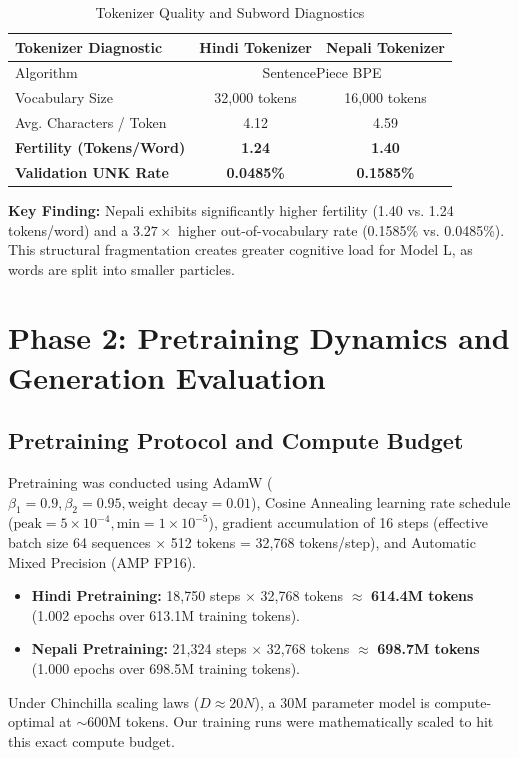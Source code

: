 \documentclass[10pt,a4paper]{article}
\begin{document}
\begin{table}[t]
\centering
\footnotesize
\setlength{\tabcolsep}{3.0pt}
\caption{Tokenizer Quality and Subword Diagnostics}
\label{tab:tokenizer_stats}
\begin{tabularx}{\columnwidth}{@{}>{\raggedright\arraybackslash}Xcc@{}}
\toprule
\textbf{Tokenizer Diagnostic} & \textbf{Hindi Tokenizer} & \textbf{Nepali Tokenizer} \\
\midrule
Algorithm & \multicolumn{2}{c}{SentencePiece BPE} \\
Vocabulary Size & 32,000 tokens & 16,000 tokens \\
Avg. Characters / Token & 4.12 & 4.59 \\
\textbf{Fertility (Tokens/Word)} & \textbf{1.24} & \textbf{1.40} \\
\textbf{Validation UNK Rate} & \textbf{0.0485\%} & \textbf{0.1585\%} \\
\bottomrule
\end{tabularx}
\end{table}

\noindent\textbf{Key Finding:} Nepali exhibits significantly higher fertility (1.40 vs. 1.24 tokens/word) and a $3.27\times$ higher out-of-vocabulary rate (0.1585\% vs. 0.0485\%). This structural fragmentation creates greater cognitive load for Model L, as words are split into smaller particles.

\section{Phase 2: Pretraining Dynamics and Generation Evaluation}

\subsection{Pretraining Protocol and Compute Budget}
Pretraining was conducted using AdamW ($\beta_1=0.9, \beta_2=0.95, \text{weight decay}=0.01$), Cosine Annealing learning rate schedule ($\text{peak}=5\times 10^{-4}, \text{min}=1\times 10^{-5}$), gradient accumulation of 16 steps (effective batch size 64 sequences $\times$ 512 tokens = 32,768 tokens/step), and Automatic Mixed Precision (AMP FP16).
\begin{itemize}[noitemsep,leftmargin=*]
    \item \textbf{Hindi Pretraining:} 18,750 steps $\times$ 32,768 tokens $\approx$ \textbf{614.4M tokens} (1.002 epochs over 613.1M training tokens).
    \item \textbf{Nepali Pretraining:} 21,324 steps $\times$ 32,768 tokens $\approx$ \textbf{698.7M tokens} (1.000 epochs over 698.5M training tokens).
\end{itemize}
Under Chinchilla scaling laws ($D \approx 20N$), a 30M parameter model is compute-optimal at $\sim 600\text{M}$ tokens. Our training runs were mathematically scaled to hit this exact compute budget.
\end{document}

